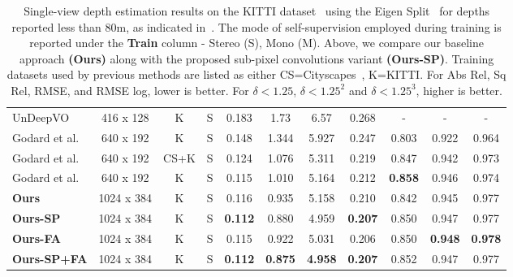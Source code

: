 \documentclass[letterpaper, 10 pt, conference]{ieeeconf}  \IEEEoverridecommandlockouts
\begin{document}
\begin{table*}[h]
{\begin{tabular}{lcccccccccc}
\midrule
UnDeepVO~\cite{li2017undeepvo} & 416 x 128 & K & S & 0.183 & 1.73 & 6.57 & 0.268 & - & - & - \\
Godard et al.~\cite{godard2017unsupervised} & 640 x 192 & K & S & 0.148 & 1.344 & 5.927 & 0.247 & 0.803 & 0.922 & 0.964\\
Godard et al.~\cite{godard2017unsupervised} & 640 x 192 & CS+K & S & 0.124 & 1.076 & 5.311 & 0.219 & 0.847 & 0.942 & 0.973\\
Godard et al.~\cite{godard2018digging} & 640 x 192 & K & S & 0.115 & 1.010 & 5.164 & 0.212 & \textbf{0.858} & 0.946 & 0.974\\
\textbf{Ours} & 1024 x 384 & K & S & 0.116 & 0.935 &  5.158 & 0.210 &  0.842 &  0.945 &  0.977\\
\textbf{Ours-SP} & 1024 x 384 & K & S & \textbf{0.112} & 0.880 & 4.959 & \textbf{0.207} & 0.850 & 0.947 & 0.977\\
\textbf{Ours-FA} & 1024 x 384 & K & S & 0.115 & 0.922 & 5.031 & 0.206 & 0.850 & \textbf{0.948} & \textbf{0.978}\\
\textbf{Ours-SP+FA} & 1024 x 384 & K & S & \textbf{0.112} & \textbf{0.875} & \textbf{4.958} & \textbf{0.207} & 0.852 & 0.947 & 0.977\\
\bottomrule
\end{tabular}\\
}
\caption{Single-view depth estimation results on the KITTI dataset~\cite{geiger2013vision} using the Eigen Split~\cite{eigen2014depth} for depths reported less than 80m, as indicated in~\cite{eigen2014depth}. The mode of self-supervision employed during training is reported under the \textbf{Train} column - Stereo (S), Mono (M). Above, we compare our baseline approach \textbf{(Ours)} along with the proposed sub-pixel convolutions variant \textbf{(Ours-SP)}. Training datasets used by previous methods are listed as either CS=Cityscapes~\cite{cordts2016cityscapes}, K=KITTI\cite{geiger2013vision}. For Abs Rel, Sq Rel, RMSE, and RMSE log, lower is better. For $\delta < 1.25$, $\delta < 1.25^2$ and $\delta < 1.25^3$, higher is better.}
\label{table:accuracy}
\vspace{-6mm}
\end{table*}
 
\end{document}
